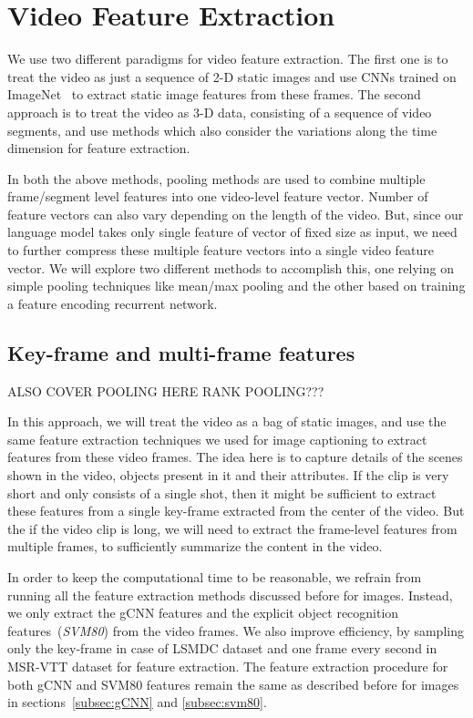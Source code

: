 \section{Video Feature Extraction}
\label{sec:VideoFeat}
We use two different paradigms for video feature extraction.
The first one is to treat the video as just a sequence of 2-D static images and
use CNNs trained on ImageNet~\cite{ImagenetOrig} to extract static image
features from these frames.
The second approach is to treat the video as 3-D data, consisting of a
sequence of video segments, and use methods which also consider the variations
along the time dimension for feature extraction.

In both the above methods, pooling methods are used to combine multiple
frame/segment level features into one video-level feature vector.
Number of feature vectors can also vary depending on the length of the video.
But, since our language model takes only single feature of vector of fixed size
as input, we need to further compress these multiple feature vectors into a
single video feature vector. 
We will explore two different methods to accomplish this, one relying on simple
pooling techniques like mean/max pooling and the other based on training a
feature encoding recurrent network.

\subsection{Key-frame and multi-frame features}
ALSO COVER POOLING HERE
RANK POOLING???

In this approach, we will treat the video as a bag of static images, and use the
same feature extraction techniques we used for image captioning to extract
features from these video frames.
The idea here is to capture details of the scenes shown in the video, objects
present in it and their attributes.
If the clip is very short and only consists of a single shot, then it might be
sufficient to extract these features from a single key-frame extracted from the
center of the video. 
But the if the video clip is long, we will need to extract the frame-level
features from multiple frames, to sufficiently summarize the content in the
video.

In order to keep the computational time to be reasonable, we refrain from
running all the feature extraction methods discussed before for images.
Instead, we only extract the gCNN features and the explicit object recognition
features~(\emph{SVM80}) from the video frames.
We also improve efficiency, by sampling only the key-frame in case of LSMDC
dataset and one frame every second in MSR-VTT dataset for feature extraction.
The feature extraction procedure for both gCNN and SVM80 features remain the
same as described before for images in sections~\ref{subsec:gCNN} and
\ref{subsec:svm80}. 

